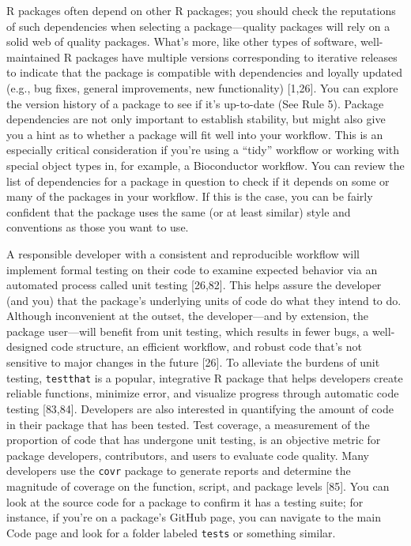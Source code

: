 \documentclass[10pt,letterpaper]{article}
\begin{document}
R packages often depend on other R packages; you should check the
reputations of such dependencies when selecting a package---quality
packages will rely on a solid web of quality packages. What's more, like
other types of software, well-maintained R packages have multiple
versions corresponding to iterative releases to indicate that the
package is compatible with dependencies and loyally updated (e.g., bug
fixes, general improvements, new functionality) {[}1,26{]}. You can
explore the version history of a package to see if it's up-to-date (See
Rule 5). Package dependencies are not only important to establish
stability, but might also give you a hint as to whether a package will
fit well into your workflow. This is an especially critical
consideration if you're using a ``tidy'' workflow or working with
special object types in, for example, a Bioconductor workflow. You can
review the list of dependencies for a package in question to check if it
depends on some or many of the packages in your workflow. If this is the
case, you can be fairly confident that the package uses the same (or at
least similar) style and conventions as those you want to use.

A responsible developer with a consistent and reproducible workflow will
implement formal testing on their code to examine expected behavior via
an automated process called unit testing {[}26,82{]}. This helps assure
the developer (and you) that the package's underlying units of code do
what they intend to do. Although inconvenient at the outset, the
developer---and by extension, the package user---will benefit from unit
testing, which results in fewer bugs, a well-designed code structure, an
efficient workflow, and robust code that's not sensitive to major
changes in the future {[}26{]}. To alleviate the burdens of unit
testing, \texttt{testthat} is a popular, integrative R package that
helps developers create reliable functions, minimize error, and
visualize progress through automatic code testing {[}83,84{]}.
Developers are also interested in quantifying the amount of code in
their package that has been tested. Test coverage, a measurement of the
proportion of code that has undergone unit testing, is an objective
metric for package developers, contributors, and users to evaluate code
quality. Many developers use the \texttt{covr} package to generate
reports and determine the magnitude of coverage on the function, script,
and package levels {[}85{]}. You can look at the source code for a
package to confirm it has a testing suite; for instance, if you're on a
package's GitHub page, you can navigate to the main Code page and look
for a folder labeled \texttt{tests} or something similar.
\end{document}
